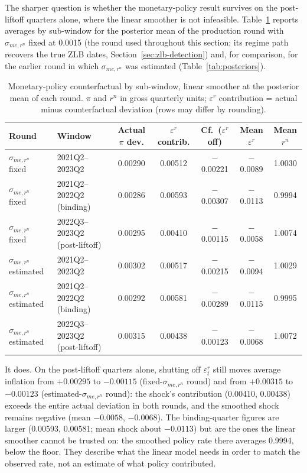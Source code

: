 \documentclass[11pt]{article}
\begin{document}
The sharper question is whether the monetary-policy result survives on the
post-liftoff quarters alone, where the linear smoother is not infeasible.
Table~\ref{tab:cf-sub} reports averages by sub-window for the posterior
mean of the production round with $\sigma_{me,r^n}$ fixed at 0.0015 (the
round used throughout this section; its regime path recovers the true ZLB
dates, Section~\ref{sec:zlb-detection}) and, for comparison, for the
earlier round in which $\sigma_{me,r^n}$ was estimated (Table~\ref{tab:posteriors}).

\begin{table}[ht]
\centering
\small
\begin{tabular}{@{}llccccc@{}}
\toprule
Round & Window & Actual $\pi$ dev. & $\varepsilon^r$ contrib. & Cf.\ ($\varepsilon^r$ off) & Mean $\varepsilon^r$ & Mean $r^n$ \\
\midrule
$\sigma_{me,r^n}$ fixed & 2021Q2--2023Q2 & 0.00290 & 0.00512 & $-$0.00221 & $-$0.0089 & 1.0030 \\
$\sigma_{me,r^n}$ fixed & 2021Q2--2022Q2 (binding) & 0.00286 & 0.00593 & $-$0.00307 & $-$0.0113 & 0.9994 \\
$\sigma_{me,r^n}$ fixed & 2022Q3--2023Q2 (post-liftoff) & 0.00295 & 0.00410 & $-$0.00115 & $-$0.0058 & 1.0074 \\
\midrule
$\sigma_{me,r^n}$ estimated & 2021Q2--2023Q2 & 0.00302 & 0.00517 & $-$0.00215 & $-$0.0094 & 1.0029 \\
$\sigma_{me,r^n}$ estimated & 2021Q2--2022Q2 (binding) & 0.00292 & 0.00581 & $-$0.00289 & $-$0.0115 & 0.9995 \\
$\sigma_{me,r^n}$ estimated & 2022Q3--2023Q2 (post-liftoff) & 0.00315 & 0.00438 & $-$0.00123 & $-$0.0068 & 1.0072 \\
\bottomrule
\end{tabular}
\caption{Monetary-policy counterfactual by sub-window, linear smoother at
the posterior mean of each round. $\pi$ and $r^n$ in gross quarterly
units; $\varepsilon^r$ contribution = actual minus counterfactual
deviation (rows may differ by rounding).}
\label{tab:cf-sub}
\end{table}

It does. On the post-liftoff quarters alone, shutting off
$\varepsilon^r_t$ still moves average inflation from $+0.00295$ to
$-0.00115$ (fixed-$\sigma_{me,r^n}$ round) and from $+0.00315$ to $-0.00123$
(estimated-$\sigma_{me,r^n}$ round): the shock's contribution (0.00410,
0.00438) exceeds the entire actual deviation in both rounds, and the smoothed
shock remains negative (mean $-0.0058$, $-0.0068$). The binding-quarter
figures are larger (0.00593, 0.00581; mean shock about $-0.0113$) but are the
ones the linear smoother cannot be trusted on: the smoothed policy rate there
averages 0.9994, below the floor. They describe what the linear model needs in
order to match the observed rate, not an estimate of what policy
contributed.
\end{document}
